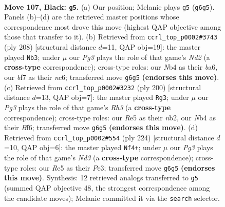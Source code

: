 \documentclass[11pt]{article}
\begin{document}
\clearpage

\begin{figure}[p]\centering
\begin{subfigure}{0.46\textwidth}\centering
\resizebox{\linewidth}{!}{%
\newchessgame
\chessboard[
  setfen={5k2/5B2/6p1/4r3/1n6/6K1/8/8 b - - 0 107},
  showmover=false,
  pgfstyle=straightmove, color=movearrow, markmove={g6-g5}
]}
\caption{}
\end{subfigure}\hfill
\begin{subfigure}{0.46\textwidth}\centering
\resizebox{\linewidth}{!}{%
\newchessgame
\chessboard[
  setfen={8/2k5/b1n5/2K5/8/4R3/3N4/8 w - - 71 105},
  showmover=false,
  pgfstyle=straightmove, color=movearrow, markmove={d2-b3}
]}
\caption{}
\end{subfigure}
\\[4pt]
\begin{subfigure}{0.46\textwidth}\centering
\resizebox{\linewidth}{!}{%
\newchessgame
\chessboard[
  setfen={8/3b4/k4B2/8/1K6/7R/1n6/8 w - - 91 101},
  showmover=false,
  pgfstyle=straightmove, color=movearrow, markmove={h3-g3}
]}
\caption{}
\end{subfigure}\hfill
\begin{subfigure}{0.46\textwidth}\centering
\resizebox{\linewidth}{!}{%
\newchessgame
\chessboard[
  setfen={8/4b3/1N6/1b5k/8/3NP3/8/6K1 w - - 19 113},
  showmover=false,
  pgfstyle=straightmove, color=movearrow, markmove={d3-f4}
]}
\caption{}
\end{subfigure}
\caption{\textbf{Move 107, Black: \texttt{g5}.} (a) Our position; Melanie plays \texttt{g5} (\texttt{g6g5}). Panels (b)--(d) are the retrieved master positions whose correspondence most drove this move (highest QAP objective among those that transfer to it). (b) Retrieved from \texttt{ccrl\_top\_p0002\#3743} (ply 208) [structural distance $d$=11, QAP obj=19]: the master played \texttt{Nb3}; under $\mu$ our \emph{Pg3} plays the role of that game's \emph{Nd2} (a \textbf{cross-type} correspondence); cross-type roles: our \emph{N}b4 as their \emph{b}a6, our \emph{b}f7 as their \emph{n}c6; transferred move \texttt{g6g5} \textbf{(endorses this move)}. (c) Retrieved from \texttt{ccrl\_top\_p0002\#3232} (ply 200) [structural distance $d$=13, QAP obj=7]: the master played \texttt{Rg3}; under $\mu$ our \emph{Pg3} plays the role of that game's \emph{Rh3} (a \textbf{cross-type} correspondence); cross-type roles: our \emph{R}e5 as their \emph{n}b2, our \emph{N}b4 as their \emph{B}f6; transferred move \texttt{g6g5} \textbf{(endorses this move)}. (d) Retrieved from \texttt{ccrl\_top\_p0002\#554} (ply 224) [structural distance $d$=10, QAP obj=6]: the master played \texttt{Nf4+}; under $\mu$ our \emph{Pg3} plays the role of that game's \emph{Nd3} (a \textbf{cross-type} correspondence); cross-type roles: our \emph{R}e5 as their \emph{P}e3; transferred move \texttt{g6g5} \textbf{(endorses this move)}. Synthesis: 12 retrieved analogs transferred to \texttt{g5} (summed QAP objective 48, the strongest correspondence among the candidate moves); Melanie committed it via the \texttt{search} selector.}
\label{fig:thought-m213}
\end{figure}
\end{document}
